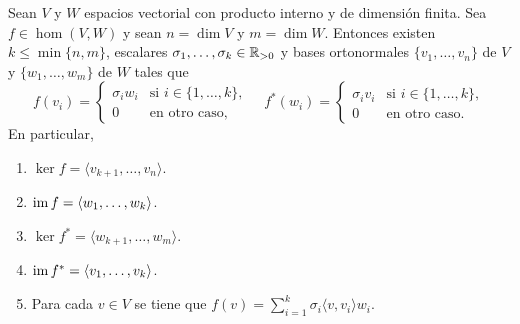\begin{thm}
    \label{thm:valores_singulares}
    Sean $V$ y $W$ espacios vectorial con producto interno y de dimensión
    finita. Sea $f\in\hom(V,W)$ y sean $n=\dim V$ y $m=\dim W$. Entonces
    existen $k\leq\min\{n,m\}$, escalares $\sigma_1,\dots,\sigma_k\in\mathbb{R}_{>0}$ y
    bases ortonormales $\{v_1,\dots,v_n\}$ de $V$ y $\{w_1,\dots,w_m\}$ de $W$
    tales que 
    \[
        f(v_i)=\begin{cases}
            \sigma_i w_i & \text{si $i\in\{1,\dots,k\}$},\\
            0 & \text{en otro caso,}
        \end{cases}
        \quad
        f^*(w_i)=\begin{cases}
            \sigma_i v_i & \text{si $i\in\{1,\dots,k\}$},\\
            0 & \text{en otro caso.}
        \end{cases}
    \]  
    En particular, 
    \begin{enumerate}
        \item $\ker f=\langle v_{k+1},\dots,v_n\rangle$.
        \item $\operatorname{im} f=\langle w_1,\dots,w_k\rangle$.
        \item $\ker f^*=\langle w_{k+1},\dots,w_m\rangle$.
        \item $\operatorname{im} f^*=\langle v_1,\dots,v_k\rangle$.
        \item Para cada $v\in V$ se tiene que 
        $f(v)=\sum_{i=1}^k\sigma_i\langle v,v_i\rangle w_i$.
    \end{enumerate}


\end{thm}
